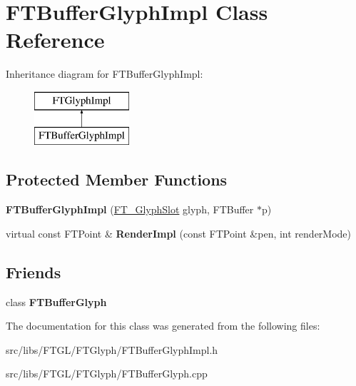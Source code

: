 \hypertarget{class_f_t_buffer_glyph_impl}{
\section{FTBufferGlyphImpl Class Reference}
\label{class_f_t_buffer_glyph_impl}
}
Inheritance diagram for FTBufferGlyphImpl:\begin{figure}[H]
\begin{center}
\leavevmode
\includegraphics[height=2.000000cm]{class_f_t_buffer_glyph_impl}
\end{center}
\end{figure}
\subsection*{Protected Member Functions}
\begin{DoxyCompactItemize}
\item 
\hypertarget{class_f_t_buffer_glyph_impl_a02a187494995d95792ef66767f04c56d}{
{\bfseries FTBufferGlyphImpl} (\hyperlink{struct_f_t___glyph_slot_rec__}{FT\_\-GlyphSlot} glyph, FTBuffer $\ast$p)}
\label{class_f_t_buffer_glyph_impl_a02a187494995d95792ef66767f04c56d}

\item 
\hypertarget{class_f_t_buffer_glyph_impl_a4f7f56caf34309cf7e1408a631b419de}{
virtual const FTPoint \& {\bfseries RenderImpl} (const FTPoint \&pen, int renderMode)}
\label{class_f_t_buffer_glyph_impl_a4f7f56caf34309cf7e1408a631b419de}

\end{DoxyCompactItemize}
\subsection*{Friends}
\begin{DoxyCompactItemize}
\item 
\hypertarget{class_f_t_buffer_glyph_impl_a385e2288042fd77f037a715e7801b451}{
class {\bfseries FTBufferGlyph}}
\label{class_f_t_buffer_glyph_impl_a385e2288042fd77f037a715e7801b451}

\end{DoxyCompactItemize}


The documentation for this class was generated from the following files:\begin{DoxyCompactItemize}
\item 
src/libs/FTGL/FTGlyph/FTBufferGlyphImpl.h\item 
src/libs/FTGL/FTGlyph/FTBufferGlyph.cpp\end{DoxyCompactItemize}
